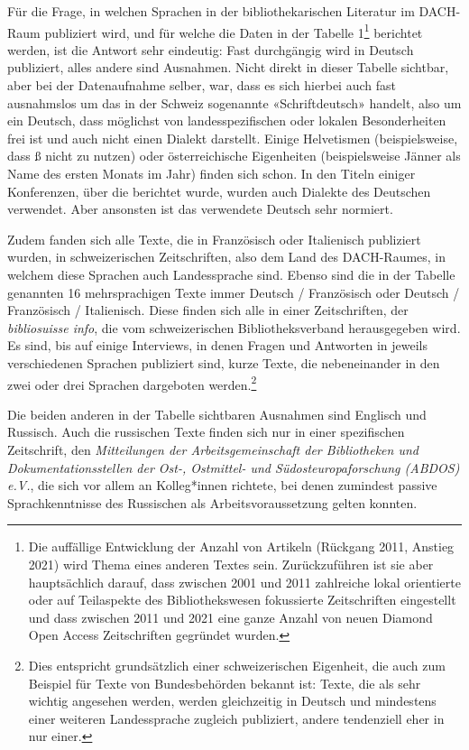 \documentclass[a4paper,
fontsize=11pt,
oneside,
numbers=noperiodatend,
parskip=half-,
bibliography=totoc,
final
]{scrartcl}
\begin{document}
Für die Frage, in welchen Sprachen in der bibliothekarischen Literatur
im DACH-Raum publiziert wird, und für welche die Daten in der Tabelle
1\footnote{Die auffällige Entwicklung der Anzahl von Artikeln (Rückgang
  2011, Anstieg 2021) wird Thema eines anderen Textes sein.
  Zurückzuführen ist sie aber hauptsächlich darauf, dass zwischen 2001
  und 2011 zahlreiche lokal orientierte oder auf Teilaspekte des
  Bibliothekswesen fokussierte Zeitschriften eingestellt und dass
  zwischen 2011 und 2021 eine ganze Anzahl von neuen Diamond Open Access
  Zeitschriften gegründet wurden.} berichtet werden, ist die Antwort
sehr eindeutig: Fast durchgängig wird in Deutsch publiziert, alles
andere sind Ausnahmen. Nicht direkt in dieser Tabelle sichtbar, aber bei
der Datenaufnahme selber, war, dass es sich hierbei auch fast
ausnahmslos um das in der Schweiz sogenannte «Schriftdeutsch» handelt,
also um ein Deutsch, dass möglichst von landesspezifischen oder lokalen
Besonderheiten frei ist und auch nicht einen Dialekt darstellt. Einige
Helvetismen (beispielsweise, dass ß nicht zu nutzen) oder
österreichische Eigenheiten (beispielsweise Jänner als Name des ersten
Monats im Jahr) finden sich schon. In den Titeln einiger Konferenzen,
über die berichtet wurde, wurden auch Dialekte des Deutschen verwendet.
Aber ansonsten ist das verwendete Deutsch sehr normiert.

Zudem fanden sich alle Texte, die in Französisch oder Italienisch
publiziert wurden, in schweizerischen Zeitschriften, also dem Land des
DACH-Raumes, in welchem diese Sprachen auch Landessprache sind. Ebenso
sind die in der Tabelle genannten 16 mehrsprachigen Texte immer Deutsch
/ Französisch oder Deutsch / Französisch / Italienisch. Diese finden
sich alle in einer Zeitschriften, der \emph{bibliosuisse info}, die vom
schweizerischen Bibliotheksverband herausgegeben wird. Es sind, bis auf
einige Interviews, in denen Fragen und Antworten in jeweils
verschiedenen Sprachen publiziert sind, kurze Texte, die nebeneinander
in den zwei oder drei Sprachen dargeboten werden.\footnote{Dies
  entspricht grundsätzlich einer schweizerischen Eigenheit, die auch zum
  Beispiel für Texte von Bundesbehörden bekannt ist: Texte, die als sehr
  wichtig angesehen werden, werden gleichzeitig in Deutsch und
  mindestens einer weiteren Landessprache zugleich publiziert, andere
  tendenziell eher in nur einer.}

Die beiden anderen in der Tabelle sichtbaren Ausnahmen sind Englisch und
Russisch. Auch die russischen Texte finden sich nur in einer
spezifischen Zeitschrift, den \emph{Mitteilungen der Arbeitsgemeinschaft
der Bibliotheken und Dokumentationsstellen der Ost-, Ostmittel- und
Südosteuropaforschung (ABDOS) e.V.}, die sich vor allem an Kolleg*innen
richtete, bei denen zumindest passive Sprachkenntnisse des Russischen
als Arbeitsvoraussetzung gelten konnten.
\end{document}
